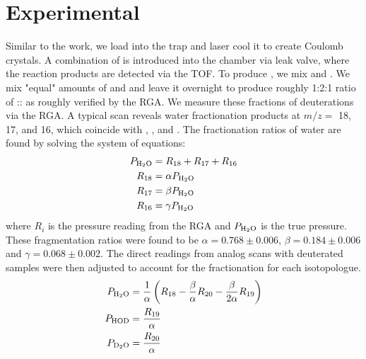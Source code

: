 \section{Experimental}

Similar to the  work, we load  into the trap and laser cool it to create Coulomb crystals. A combination of  is introduced into the chamber via leak valve, where the reaction products are detected via the TOF. To produce , we mix  and .\cite{Pyper1967,Zhou2013} We mix "equal" amounts of  and  and leave it overnight to produce roughly 1:2:1 ratio of :: as roughly verified by the RGA. We measure these fractions of deuterations via the RGA. A typical scan reveals water fractionation products at $m/z =$ 18, 17, and 16, which coincide with , , and . The fractionation ratios of water are found by solving the system of equations:
\begin{align}
	P_{\ce{H2O}} & = R_{18} + R_{17} + R_{16} \\
	R_{18} & = \alpha P_{\ce{H2O}} \\
	R_{17} & = \beta P_{\ce{H2O}} \\
	R_{16} & = \gamma P_{\ce{H2O}}
\end{align}
where $R_i$ is the pressure reading from the RGA and $P_{\ce{H2O}}$ is the true  pressure. These fragmentation ratios were found to be $\alpha = 0.768 \pm 0.006$, $\beta = 0.184 \pm 0.006$ and $\gamma = 0.068 \pm 0.002$. The direct readings from analog scans with deuterated samples were then adjusted to account for the fractionation for each isotopologue.
\begin{align}
	P_{\ce{H2O}} & = \frac{1}{\alpha}\left(R_{18} - \frac{\beta}{\alpha}R_{20} - \frac{\beta}{2\alpha} R_{19}\right) \\
	P_{\ce{HOD}} & = \frac{R_{19}}{\alpha} \\
	P_{\ce{D2O}} & = \frac{R_{20}}{\alpha}
\end{align}

